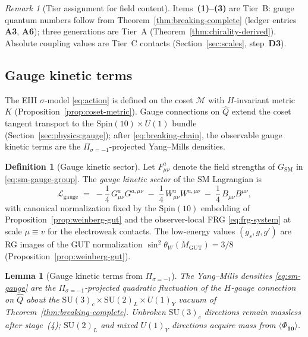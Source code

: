 \documentclass[aps,prd,onecolumn,amsmath,amssymb,nofootinbib,11pt]{revtex4-2}
\numberwithin{equation}{section}
\theoremstyle{plain}
\newtheorem{lemma}[theorem]{Lemma}
\theoremstyle{definition}
\newtheorem{definition}[theorem]{Definition}
\theoremstyle{remark}
\newtheorem{remark}[theorem]{Remark}
\newcommand{\Spin}{\mathrm{Spin}}
\begin{document}
\begin{remark}[Tier assignment for field content]
Items~\textbf{(1)--(3)} are Tier~B: gauge quantum numbers follow from
Theorem~\ref{thm:breaking-complete} (ledger entries \textbf{A3}, \textbf{A6});
three generations are Tier~A
(Theorem~\ref{thm:chirality-derived}). Absolute coupling values are Tier~C
contacts (Section~\ref{sec:scales}, step~\textbf{D3}).
\end{remark}

\subsection{Gauge kinetic terms}
\label{sec:sm-lagrangian:gauge}

The EIII $\sigma$-model \eqref{eq:action} is defined on the coset
$\mathcal{M}$ with $H$-invariant metric $K$ (Proposition~\ref{prop:coset-metric}).
Gauge connections on $\hat Q$ extend the coset tangent transport to the
$\Spin(10)\times U(1)$ bundle (Section~\ref{sec:physics:gauge}); after
\eqref{eq:breaking-chain}, the observable gauge kinetic terms are the
$\Pi_{\sigma=-1}$-projected Yang--Mills densities.

\begin{definition}[Gauge kinetic sector]\label{def:sm-gauge}
Let $F_{\mu\nu}^a$ denote the field strengths of $G_{\mathrm{SM}}$ in
\eqref{eq:sm-gauge-group}. The \emph{gauge kinetic sector} of the SM
Lagrangian is
\begin{equation}\label{eq:sm-gauge}
  \mathcal{L}_{\mathrm{gauge}}
  \;=\;
  -\frac{1}{4}\,G_{\mu\nu}^a G^{a,\mu\nu}
  \;-\;
  \frac{1}{4}\,W_{\mu\nu}^a W^{a,\mu\nu}
  \;-\;
  \frac{1}{4}\,B_{\mu\nu} B^{\mu\nu},
\end{equation}
with canonical normalization fixed by the $\Spin(10)$ embedding of
Proposition~\ref{prop:weinberg-gut} and the observer-local FRG
\eqref{eq:frg-system} at scale $\mu\equiv v$ for the electroweak contacts.
The low-energy values $(g_s,g,g')$ are RG images of the GUT normalization
$\sin^2\theta_W(M_{\mathrm{GUT}})=3/8$ (Proposition~\ref{prop:weinberg-gut}).
\end{definition}

\begin{lemma}[Gauge kinetic terms from $\Pi_{\sigma=-1}$]
\label{lem:sm-gauge-derived}
The Yang--Mills densities \eqref{eq:sm-gauge} are the $\Pi_{\sigma=-1}$-projected
quadratic fluctuation of the $H$-gauge connection on $\hat Q$ about the
$\mathrm{SU}(3)_c\times\mathrm{SU}(2)_L\times U(1)_Y$ vacuum of
Theorem~\ref{thm:breaking-complete}. Unbroken $\mathrm{SU}(3)_c$ directions
remain massless after stage~(4); $\mathrm{SU}(2)_L$ and mixed
$U(1)_Y$ directions acquire mass from $\langle\Phi_{\mathbf{10}}\rangle$.
\end{lemma}
\end{document}
